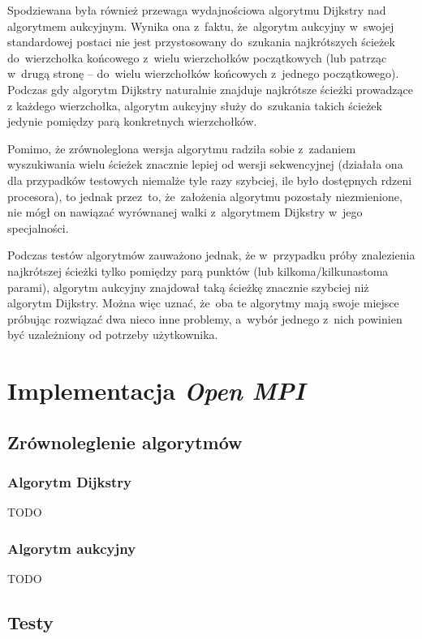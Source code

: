 \documentclass {report}
\begin{document}
Spodziewana była również przewaga wydajnościowa algorytmu Dijkstry nad algorytmem aukcyjnym. Wynika ona z~faktu, że~algorytm aukcyjny w~swojej standardowej postaci nie jest przystosowany do~szukania najkrótszych ścieżek do~wierzchołka końcowego z~wielu wierzchołków początkowych (lub patrząc w~drugą stronę -- do~wielu wierzchołków końcowych z~jednego początkowego). Podczas gdy algorytm Dijkstry naturalnie znajduje najkrótsze ścieżki prowadzące z każdego wierzchołka, algorytm aukcyjny służy do~szukania takich ścieżek jedynie pomiędzy parą konkretnych wierzchołków.

Pomimo, że zrównoleglona wersja algorytmu radziła sobie z~zadaniem wyszukiwania wielu ścieżek znacznie lepiej od wersji sekwencyjnej (działała ona dla przypadków testowych niemalże tyle razy szybciej, ile było dostępnych rdzeni procesora), to jednak przez~to, że~założenia algorytmu pozostały niezmienione, nie mógł on nawiązać wyrównanej walki z~algorytmem Dijkstry w~jego specjalności.

Podczas testów algorytmów zauważono jednak, że w~przypadku próby znalezienia najkrótszej ścieżki tylko pomiędzy parą punktów (lub kilkoma/kilkunastoma parami), algorytm aukcyjny znajdował taką ścieżkę znacznie szybciej niż algorytm Dijkstry. Można więc uznać, że~oba te algorytmy mają swoje miejsce próbując rozwiązać dwa nieco inne problemy, a~wybór jednego z~nich powinien być uzależniony od potrzeby użytkownika.

\chapter{Implementacja \emph{Open MPI}}

\section{Zrównoleglenie algorytmów}

\subsection{Algorytm Dijkstry}

TODO

\subsection{Algorytm aukcyjny}

TODO

\section{Testy}
\end{document}
